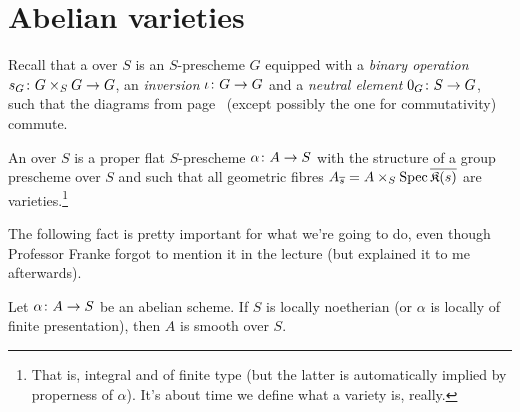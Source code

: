 \documentclass[a4paper,parskip=half,numbers=enddot, DIV=12]{scrreprt}
\begin{document}
\chapter{Abelian varieties}
Recall that a  over $S$ is an $S$-prescheme $G$ equipped with a \emph{binary operation} $s_G\colon G\times_SG\morphism G$, an \emph{inversion} $\iota\colon G\morphism G$ and a \emph{neutral element} $0_G\colon S\morphism G$, such that the diagrams from page~\pageref{par:groupScheme} (except possibly the one for commutativity) commute.
\begin{defi}
	An  over $S$ is a proper flat $S$-prescheme $\alpha\colon A\morphism S$ with the structure of a group prescheme over $S$  and such that all geometric fibres $A_{\overline{s}}=A\times_S\operatorname{Spec}\overline{\mathfrak{K}(s)}$ are varieties.\footnote{That is, integral and of finite type (but the latter is automatically implied by properness of $\alpha$). It's about time we define what a variety is, really.}
\end{defi}
The following fact is pretty important for what we're going to do, even though Professor Franke forgot to mention it in the lecture (but explained it to me afterwards).
\begin{fact}
	Let $\alpha\colon A\morphism S$ be an abelian scheme. If $S$ is locally noetherian (or $\alpha$ is locally of finite presentation), then $A$ is smooth over $S$.
\end{fact}
\end{document}
